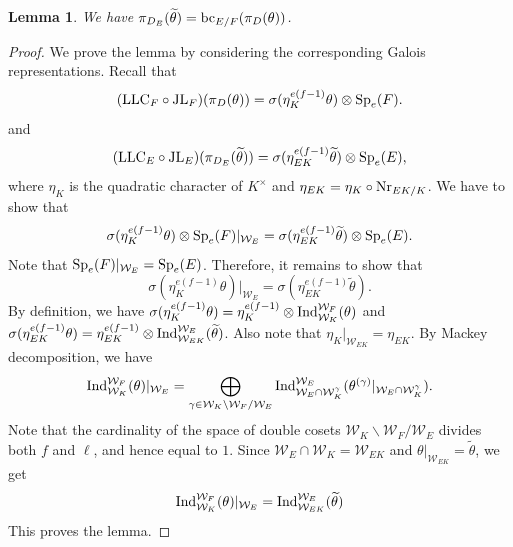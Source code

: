 \documentclass[10pt, reqno]{amsart}
\theoremstyle{plain}
\numberwithin{equation}{section}
\newtheorem{lemma}[theorem]{Lemma}
\begin{document}
\begin{lemma}
We have 
$\pi_{D_E}(\widetilde{\theta}) = {\rm bc}_{E/F}(\pi_D(\theta))$.
\end{lemma}
\begin{proof}
We prove the lemma by considering the corresponding Galois representations. Recall that
$$ ({\rm LLC}_F\circ {\rm JL}_F)(\pi_D(\theta)) = \sigma(\eta_K^{e(f-1)}\theta)\otimes {\rm Sp}_e(F). $$
and 
$$ ({\rm LLC}_E\circ {\rm JL}_E)(\pi_{D_E}(\widetilde{\theta})) = \sigma(\eta_{EK}^{e(f-1)}\widetilde{\theta})\otimes{\rm Sp}_e(E), $$
where $\eta_K$ is the quadratic character of $K^\times$ and $\eta_{EK} = \eta_K\circ {\rm Nr}_{EK/K}$. We have to show that 
$$ \sigma(\eta_K^{e(f-1)}\theta)\otimes {\rm Sp}_e(F) |_{\mathcal{W}_E} = \sigma(\eta_{EK}^{e(f-1)}\widetilde{\theta})\otimes{\rm Sp}_e(E). $$
Note that ${\rm Sp}_e(F)|_{\mathcal{W}_E} ={\rm Sp}_e(E)$. Therefore, it remains to show that 
$$ \sigma(\eta_{K}^{e(f-1)}\theta)|_{\mathcal{W}_E} =\sigma(\eta_{EK}^{e(f-1)}\widetilde{\theta}). $$
By definition, we have $\sigma(\eta_K^{e(f-1)}\theta) = \eta_K^{e(f-1)}\otimes{\rm Ind}_{\mathcal{W}_K}^{\mathcal{W}_F}(\theta)$ and $\sigma(\eta_{EK}^{e(f-1)}\theta) = \eta_{EK}^{e(f-1)}\otimes{\rm Ind}_{\mathcal{W}_{EK}}^{\mathcal{W}_E}(\widetilde{\theta})$. Also note that $\eta_K|_{\mathcal{W}_{EK}} = \eta_{EK}$. By Mackey decomposition, we have
$$ {\rm Ind}_{\mathcal{W}_{K}}^{\mathcal{W}_F}(\theta)|_{\mathcal{W}_E} = \bigoplus_{\gamma\in\mathcal{W}_K\backslash \mathcal{W}_F/\mathcal{W}_E}{\rm Ind}_{\mathcal{W}_E\cap \mathcal{W}_K^\gamma}^{\mathcal{W}_E}(\theta^{(\gamma)}|_{\mathcal{W}_E\cap
\mathcal{W}_K^\gamma}). $$
Note that the cardinality of the space of double cosets $\mathcal{W}_K\backslash \mathcal{W}_F/\mathcal{W}_E$ divides both $f$ and $\ell$, and hence equal to $1$. Since $\mathcal{W}_E\cap\mathcal{W}_K=\mathcal{W}_{EK}$ and $\theta|_{\mathcal{W}_{EK}} =\widetilde{\theta}$, we get
$$ {\rm Ind}_{\mathcal{W}_{K}}^{\mathcal{W}_F}(\theta)|_{\mathcal{W}_E} = {\rm Ind}_{\mathcal{W}_{EK}}^{\mathcal{W}_E}(\widetilde{\theta}) $$
This proves the lemma.
\end{proof}


\end{document}
